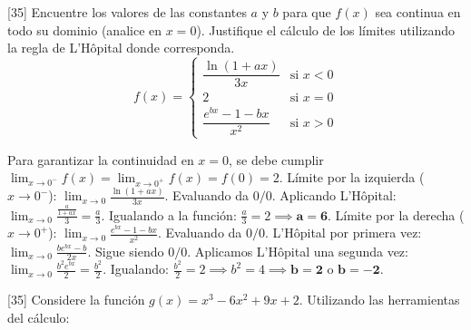 \documentclass[11pt,paper=a4,answers, addpoints]{exam}
\begin{document}
\begin{questions}
[35]
Encuentre los valores de las constantes $a$ y $b$ para que $f(x)$ sea continua en todo su dominio (analice en $x = 0$). Justifique el cálculo de los límites utilizando la regla de L'Hôpital donde corresponda.
\[
f(x) = \begin{cases} 
\dfrac{\ln(1+ax)}{3x} & \text{si } x < 0 \\ 
2 & \text{si } x = 0 \\ 
\dfrac{e^{bx} - 1 - bx}{x^2} & \text{si } x > 0 
\end{cases}
\]

\begin{solution}
Para garantizar la continuidad en $x=0$, se debe cumplir $\lim_{x \to 0^-} f(x) = \lim_{x \to 0^+} f(x) = f(0) = 2$.
Límite por la izquierda ($x \to 0^-$): $\lim_{x \to 0} \frac{\ln(1+ax)}{3x}$. Evaluando da $0/0$. Aplicando L'Hôpital: $\lim_{x \to 0} \frac{\frac{a}{1+ax}}{3} = \frac{a}{3}$. Igualando a la función: $\frac{a}{3} = 2 \implies \mathbf{a = 6}$.
Límite por la derecha ($x \to 0^+$): $\lim_{x \to 0} \frac{e^{bx}-1-bx}{x^2}$. Evaluando da $0/0$. L'Hôpital por primera vez: $\lim_{x \to 0} \frac{be^{bx}-b}{2x}$. Sigue siendo $0/0$. Aplicamos L'Hôpital una segunda vez: $\lim_{x \to 0} \frac{b^2e^{bx}}{2} = \frac{b^2}{2}$. Igualando: $\frac{b^2}{2} = 2 \implies b^2 = 4 \implies \mathbf{b = 2} \text{ o } \mathbf{b = -2}$.
\end{solution}

[35]
Considere la función $g(x) = x^3 - 6x^2 + 9x + 2$. Utilizando las herramientas del cálculo:


\end{questions}
\end{document}
